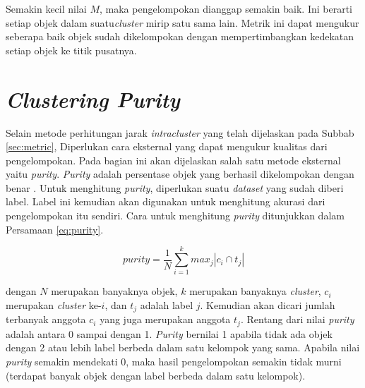 Semakin kecil nilai $M$, maka pengelompokan dianggap semakin baik. Ini berarti setiap objek dalam suatu\textit{cluster} mirip satu sama lain. Metrik ini dapat mengukur seberapa baik objek sudah dikelompokan dengan mempertimbangkan kedekatan setiap objek ke titik pusatnya.

\section{\textit{Clustering Purity}}
\label{sec:purity}
Selain metode perhitungan jarak \textit{intracluster} yang telah dijelaskan pada Subbab \ref{sec:metric}, Diperlukan cara eksternal yang dapat mengukur kualitas dari pengelompokan. Pada bagian ini akan dijelaskan salah satu metode eksternal yaitu \textit{purity}. \textit{Purity} adalah persentase objek yang berhasil dikelompokan dengan benar \cite{schutze2008introduction}. Untuk menghitung \textit{purity}, diperlukan suatu \textit{dataset} yang sudah diberi label. Label ini kemudian akan digunakan untuk menghitung akurasi dari pengelompokan itu sendiri. Cara untuk menghitung \textit{purity} ditunjukkan dalam Persamaan \ref{eq:purity}.

\begin{equation}
	\label{eq:purity}
	purity=\frac{1}{N}\sum^k_{i=1} max_j |c_i \cap t_j|
\end{equation}

dengan $N$ merupakan banyaknya objek, $k$ merupakan banyaknya \textit{cluster}, $c_i$ merupakan \textit{cluster} ke-$i$, dan $t_j$ adalah label $j$. Kemudian akan dicari jumlah terbanyak anggota $c_i$ yang juga merupakan anggota $t_j$. Rentang dari nilai \textit{purity} adalah antara 0 sampai dengan 1. \textit{Purity} bernilai 1 apabila tidak ada objek dengan 2 atau lebih label berbeda dalam satu kelompok yang sama. Apabila nilai \textit{purity} semakin mendekati 0, maka hasil pengelompokan semakin tidak murni (terdapat banyak objek dengan label berbeda dalam satu kelompok).
